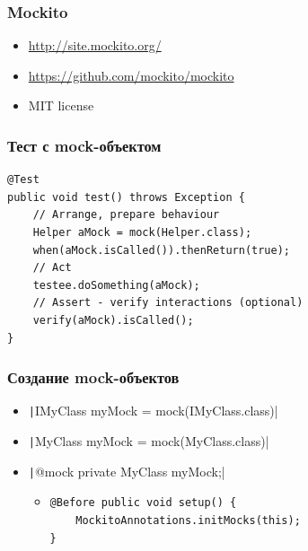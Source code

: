 \documentclass[xetex,mathserif,serif]{beamer}
\begin{document}
	\begin{frame}
		\frametitle{Mockito}
		\begin{itemize}
			\item \url{http://site.mockito.org/}
			\item \url{https://github.com/mockito/mockito}
			\item MIT license
		\end{itemize}
	\end{frame}

	\begin{frame}[fragile]
		\frametitle{Тест с mock-объектом}
		\begin{verbatim}
@Test
public void test() throws Exception {
    // Arrange, prepare behaviour
    Helper aMock = mock(Helper.class);
    when(aMock.isCalled()).thenReturn(true);
    // Act
    testee.doSomething(aMock);
    // Assert - verify interactions (optional)
    verify(aMock).isCalled();
}
		\end{verbatim}
	\end{frame}

	\begin{frame}[fragile]
		\frametitle{Создание mock-объектов}
		\begin{itemize}
			\item \texttt|IMyClass myMock = mock(IMyClass.class)|
			\pause
			\item \texttt|MyClass myMock = mock(MyClass.class)|
			\pause
			\item \texttt|@mock private MyClass myMock;|
			\begin{itemize}
				\item 
					\begin{verbatim}
@Before public void setup() { 
    MockitoAnnotations.initMocks(this); 
}
					\end{verbatim}
			\end{itemize}
		\end{itemize}
	\end{frame}
\end{document}
